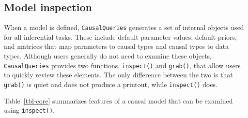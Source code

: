 \documentclass[
  11pt,
  article]{jss}
\begin{document}
\subsection{Model inspection}\label{model-inspection}

When a model is defined, \texttt{CausalQueries} generates a set of
internal objects used for all inferential tasks. These include default
parameter values, default priors, and matrices that map parameters to
causal types and causal types to data types. Although users generally do
not need to examine these objects, \texttt{CausalQueries} provides two
functions, \texttt{inspect()} and \texttt{grab()}, that allow users to
quickly review these elements. The only difference between the two is
that \texttt{grab()} is quiet and does not produce a printout, while
\texttt{inspect()} does.

Table~\ref{tbl-core} summarizes features of a causal model that can be
examined using \texttt{inspect()}.
\end{document}
